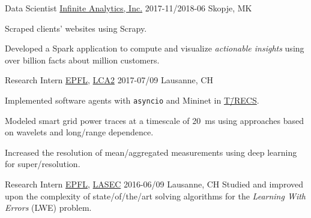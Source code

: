 \documentclass[%
version=last,%
fontsize=11pt,%
paper=A4,%
headinclude=false,%
footinclude=false,%
headlines=0,%
footlines=0,%
areasetadvanced,%
toc=bibnumbered,%
]{scrartcl}%
\begin{document}
\begin{minipage}[t]{0.575\textwidth}
  \WorkEntry%
  {Data Scientist}%
  {\href{http://infiniteanalytics.com/}{Infinite Analytics, Inc.}}%
  {2017-11/2018-06}%
  {Skopje, MK}%
  {%
    \begin{Items}
    \item Scraped clients’ websites using Scrapy.
    \item Developed a Spark application to compute and visualize
      \emph{actionable insights} using over  billion facts about
       million customers.
    \end{Items}%
  }

  \WorkEntry%
  {Research Intern}%
  {\href{https://epfl.ch/}{EPFL}, \href{http://lca.epfl.ch/}{LCA2}}%
  {2017-07/09}%
  {Lausanne, CH}%
  {%
    \begin{Items}
    \item Implemented software agents with \texttt{asyncio} and
      Mininet in
      \href{https://www.epfl.ch/labs/desl-pwrs/smartgrid/t-recs/}{T\=/RECS}.
    \item Modeled smart grid power traces at a timescale of \SI{20}{\ms} using
      approaches based on wavelets and long\-/range dependence.
    \item Increased the resolution of mean\-/aggregated measurements using deep
      learning for super\-/resolution.
    \end{Items}%
  }

  \WorkEntry%
  {Research Intern}%
  {\href{https://epfl.ch/}{EPFL}, \href{https://lasec.epfl.ch/}{LASEC}}%
  {2016-06/09}%
  {Lausanne, CH}%
  {%
    Studied and improved upon the complexity of state\-/of\-/the\-/art solving
    algorithms for the \emph{Learning With Errors} (LWE) problem.%
  }
\end{minipage}%
\hfill%
\end{document}
